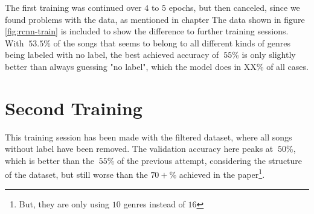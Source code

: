 The first training was continued over $4$ to $5$ epochs, but then canceled, since we found problems with the data, as mentioned in chapter %
The data shown in figure \ref{fig:rcnn-train} is included to show the difference to further training sessions.
With $~53.5$\% of the songs that seems to belong to all different kinds of genres being labeled with no label, the best achieved accuracy of $~55$\% is only slightly better than always guessing "no label", which the model does in XX\% of all cases.

\section{Second Training}
\label{sec:rcnn-second}
This training session has been made with the filtered dataset, where all songs without label have been removed. The validation accuracy here peaks at $~50$\%, which is better than the $~55$\% of the previous attempt, considering the structure of the dataset, but still worse than the $70+$\% achieved in the paper\footnote{But, they are only using $10$ genres instead of $16$}.

